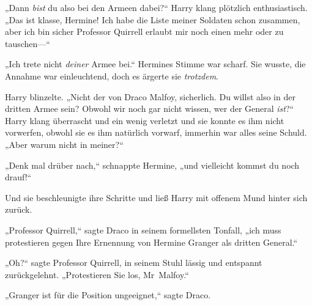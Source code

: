 „Dann \emph{bist} du also bei den Armeen dabei?“ Harry klang plötzlich enthusiastisch. „Das ist klasse, Hermine! Ich habe die Liste meiner Soldaten schon zusammen, aber ich bin sicher Professor Quirrell erlaubt mir noch einen mehr oder zu tauschen—“

„Ich trete nicht \emph{deiner} Armee bei.“ Hermines Stimme war scharf. Sie wusste, die Annahme war einleuchtend, doch es ärgerte sie \emph{trotzdem}.

Harry blinzelte. „Nicht der von Draco Malfoy, sicherlich. Du willst also in der dritten Armee sein? Obwohl wir noch gar nicht wissen, wer der General \emph{ist}?“ Harry klang überrascht und ein wenig verletzt und sie konnte es ihm nicht vorwerfen, obwohl sie es ihm natürlich vorwarf, immerhin war alles seine Schuld. „Aber warum nicht in meiner?“

„Denk mal drüber nach,“ schnappte Hermine, „und vielleicht kommst du noch drauf!“

Und sie beschleunigte ihre Schritte und ließ Harry mit offenem Mund hinter sich zurück.

\later

„Professor Quirrell,“ sagte Draco in seinem formellsten Tonfall, „ich muss protestieren gegen Ihre Ernennung von Hermine Granger als dritten General.“

„Oh?“ sagte Professor Quirrell, in seinem Stuhl lässig und entspannt zurückgelehnt. „Protestieren Sie los, Mr~Malfoy.“

„Granger ist für die Position ungeeignet,“ sagte Draco.


